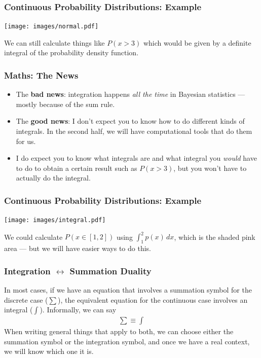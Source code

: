 \documentclass{beamer}
\begin{document}
\begin{frame}
\frametitle{Continuous Probability Distributions: Example}

\begin{center}
\texttt{[image: images/normal.pdf]}
\end{center}

We can still calculate things like $P(x > 3)$ which would be
given by a definite integral of the probability density function.

\end{frame}

\begin{frame}
\frametitle{Maths: The News}
\begin{itemize}
\item The {\bf bad news}: integration happens {\em all the time} in Bayesian
statistics --- mostly because of the sum rule. \\[0.5em]\pause
\item The {\bf good news}: I don't expect you to know how to do different
kinds of integrals. In the second half, we will have computational tools that
do them for us.\\[0.5em]\pause
\item I do expect you to know what integrals are and what integral you
{\em would} have to do to obtain a certain result such as $P(x > 3)$, but you
won't have to actually do the integral.
\end{itemize}

\end{frame}


\begin{frame}
\frametitle{Continuous Probability Distributions: Example}

\begin{center}
\texttt{[image: images/integral.pdf]}
\end{center}
We could calculate $P(x \in [1, 2])$ using $\int_1^2 p(x) \, dx$, which is
the shaded pink area --- but we will have easier ways to do this.


\end{frame}


\begin{frame}
\frametitle{Integration $\leftrightarrow$ Summation Duality}
In most cases, if we have an equation that involves a summation symbol
for the discrete case ($\sum$), the equivalent equation for the continuous
case involves an integral ($\int$).
Informally, we can say
\begin{align}
\sum \equiv \int
\end{align}\pause
When writing general things that apply to both, we can choose either the
summation symbol or the integration symbol, and once we have a real context,
we will know which one it is.

\end{frame}
\end{document}
